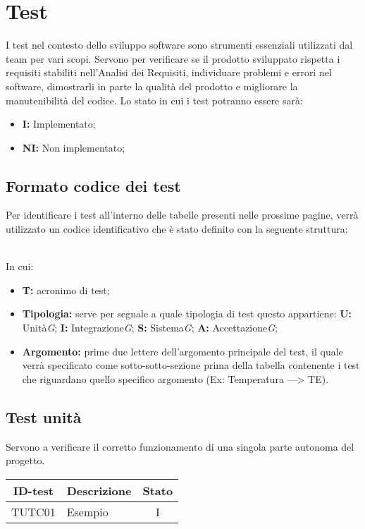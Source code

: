 \section{Test}
I test nel contesto dello sviluppo software sono strumenti essenziali utilizzati dal team per vari scopi. Servono per verificare se il prodotto sviluppato rispetta i requisiti stabiliti nell'Analisi dei Requisiti, individuare problemi e errori nel software, dimostrarli in parte la qualità del prodotto e migliorare la manutenibilità del codice.
Lo stato in cui i test potranno essere sarà:
\begin{itemize}
    \item \textbf{I:} Implementato;
    \item \textbf{NI:} Non implementato;
\end{itemize}

\subsection{Formato codice dei test}
Per identificare i test all’interno delle tabelle presenti nelle prossime pagine, verrà utilizzato un codice identificativo che è stato definito con la seguente struttura:

 \\

In cui:
\begin{itemize}
    \item \textbf{T:} acronimo di test;
    \item \textbf{Tipologia:} serve per segnale a quale tipologia di test questo appartiene:
        \subitem \textbf{U:} Unità\textit{G};
        \subitem \textbf{I:} Integrazione\textit{G};
        \subitem \textbf{S:} Sistema\textit{G};
        \subitem \textbf{A:} Accettazione\textit{G};
    \item \textbf{Argomento:} prime due lettere dell’argomento principale del test, il quale verrà specificato come sotto-sotto-sezione prima della tabella contenente i test che riguardano quello specifico argomento (Ex: Temperatura —> TE). 
\end{itemize}
\subsection{Test unità}
Servono a verificare il corretto funzionamento di una singola parte autonoma del progetto.
\begin{tabular}{|c|p{4cm}|c|}
    \hline
    \textbf{ID-test} & \textbf{Descrizione} & \textbf{Stato} \\
    \hline
    TUTC01 & Esempio & I \\
    \hline
\end{tabular}

